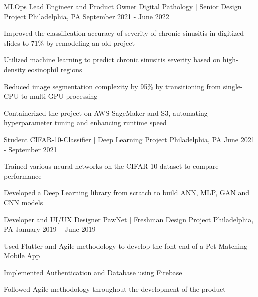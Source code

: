 
\begin{cventries}

	\cventry
	{MLOps Lead Engineer and Product Owner}
	{Digital Pathology | {\color{gray} Senior Design Project}}
	{Philadelphia, PA}
	{September 2021 - June 2022}
	{\begin{cvitems}
        \item{Improved the classification accuracy of severity of chronic sinusitis in digitized slides to 71\% by remodeling an old project}
        \item{Utilized machine learning to predict chronic sinusitis severity based on high-density eosinophil regions}
        \item{Reduced image segmentation complexity by 95\% by transitioning from single-CPU to multi-GPU processing}
        \item{Containerized the project on AWS SageMaker and S3, automating hyperparameter tuning and enhancing runtime speed}
	\end{cvitems}}

	\cventry
	{Student}
	{CIFAR-10-Classifier | {\color{gray} Deep Learning Project}}
	{Philadelphia, PA}
	{June 2021 - September 2021}
	{\begin{cvitems}
		\item {Trained various neural networks on the CIFAR-10 dataset to compare performance}
		\item {Developed a Deep Learning library from scratch to build ANN, MLP, GAN and CNN models}
	\end{cvitems}}

	\cventry
	{Developer and UI/UX Designer}
	{PawNet | {\color{gray} Freshman Design Project}}
	{Philadelphia, PA}
	{January 2019 – June 2019}
	{\begin{cvitems}
		\item {Used Flutter and Agile methodology to develop the font end of a Pet Matching Mobile App}
		\item {Implemented Authentication and Database using Firebase}
		\item {Followed Agile methodology throughout the development of the product}
		\end{cvitems}}

\end{cventries}